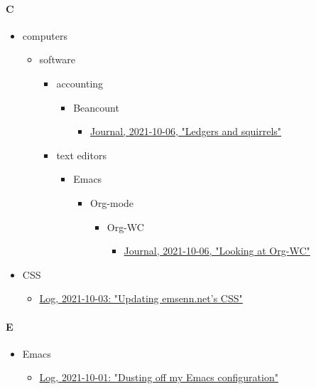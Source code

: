 \documentclass[11pt]{article}
\begin{document}
\paragraph*{C}
\label{sec:org582028e}
\begin{itemize}
\item computers
\begin{itemize}
\item software
\begin{itemize}
\item accounting
\begin{itemize}
\item Beancount
\begin{itemize}
\item \href{emsenn.org}{Journal, 2021-10-06, "Ledgers and squirrels"}
\end{itemize}
\end{itemize}
\item text editors
\begin{itemize}
\item Emacs
\begin{itemize}
\item Org-mode
\begin{itemize}
\item Org-WC
\begin{itemize}
\item \href{emsenn.org}{Journal, 2021-10-06, "Looking at Org-WC"}
\end{itemize}
\end{itemize}
\end{itemize}
\end{itemize}
\end{itemize}
\end{itemize}
\item CSS
\begin{itemize}
\item \href{emsenn.org}{Log, 2021-10-03: "Updating emsenn.net's CSS"}
\end{itemize}
\end{itemize}
\paragraph*{E}
\label{sec:org29451a2}
\begin{itemize}
\item Emacs
\begin{itemize}
\item \href{emsenn.org}{Log, 2021-10-01: "Dusting off my Emacs configuration"}
\end{itemize}
\end{itemize}
\end{document}
